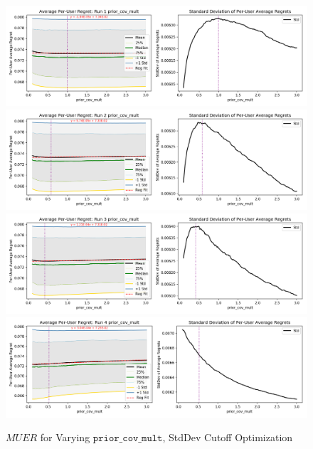 	\begin{figure}[H]
	\includegraphics[width=1.1\textwidth,center]{figures/opt_param/opt_param_std_11100_prior_cov_mult1.png}%
	\newline
	\includegraphics[width=1.1\textwidth,center]{figures/opt_param/opt_param_std_11100_prior_cov_mult2.png}%
	\newline
	\includegraphics[width=1.1\textwidth,center]{figures/opt_param/opt_param_std_11100_prior_cov_mult3.png}%
	\newline
	\includegraphics[width=1.1\textwidth,center]{figures/opt_param/opt_param_std_11100_prior_cov_mult4.png}%
	\caption{$MUER$ for Varying $\mathtt{prior\_cov\_mult}$, StdDev Cutoff Optimization}
	\end{figure}
	\fi


​


